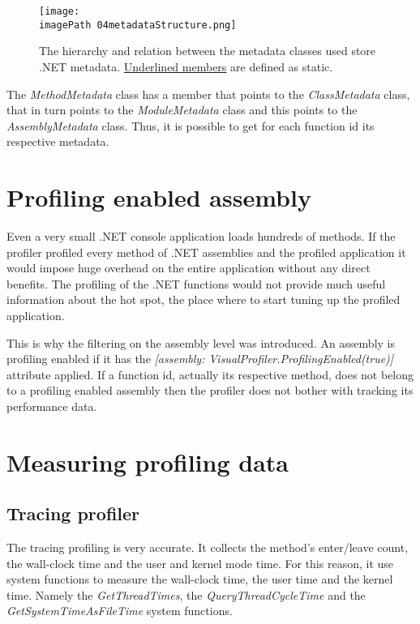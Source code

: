 \begin{figure}
	\centering
		\texttt{[image: \\imagePath 04metadataStructure.png]}
		\caption{The hierarchy and relation between the metadata classes used store .NET metadata. \underline{Underlined members} are defined as static.}
	\label{fig:04metadataStructure}
\end{figure}

The \textit{MethodMetadata} class has a member that points to the \textit{ClassMetadata} class, that in turn points to the \textit{ModuleMetadata} class and this points to the \textit{AssemblyMetadata} class. Thus, it is possible to get for each function id its respective metadata.

\section{Profiling enabled assembly}
\label{subsubsec:04ProfEnabAssem}
Even a very small .NET console application loads hundreds of methods. If the profiler profiled every method of .NET assemblies and the profiled application it would impose huge overhead on the entire application without any direct benefits. The profiling of the .NET functions would not provide much useful information about the hot spot, the place where to start tuning up the profiled application. 

This is why the filtering on the assembly level was introduced. An assembly is profiling enabled if it has the \textit{[assembly: VisualProfiler.ProfilingEnabled(true)]} attribute applied. If a function id, actually its respective method, does not belong to a profiling enabled assembly then the profiler does not bother with tracking its performance data.

\section{Measuring profiling data}
\subsection{Tracing profiler}
The tracing profiling is very accurate. It collects the method's enter/leave count, the wall-clock time and the user and kernel mode time. For this reason, it use system functions to measure the wall-clock time, the user time and the kernel time. Namely the \textit{GetThreadTimes}, the \textit{QueryThreadCycleTime} and the \textit{GetSystemTimeAsFileTime} system functions.

